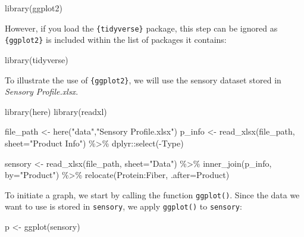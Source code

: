 \documentclass[
]{book}
\newenvironment{Shaded}{\begin{snugshade}}{\end{snugshade}}
\newcommand{\AttributeTok}[1]{\textcolor[rgb]{0.77,0.63,0.00}{#1}}
\newcommand{\FunctionTok}[1]{\textcolor[rgb]{0.00,0.00,0.00}{#1}}
\newcommand{\NormalTok}[1]{#1}
\newcommand{\OtherTok}[1]{\textcolor[rgb]{0.56,0.35,0.01}{#1}}
\newcommand{\SpecialCharTok}[1]{\textcolor[rgb]{0.00,0.00,0.00}{#1}}
\newcommand{\StringTok}[1]{\textcolor[rgb]{0.31,0.60,0.02}{#1}}
\begin{document}
\begin{Shaded}
\begin{Highlighting}[]
\FunctionTok{library}\NormalTok{(ggplot2)}
\end{Highlighting}
\end{Shaded}

However, if you load the \texttt{\{tidyverse\}} package, this step can be ignored as \texttt{\{ggplot2\}} is included within the list of packages it contains:

\begin{Shaded}
\begin{Highlighting}[]
\FunctionTok{library}\NormalTok{(tidyverse)}
\end{Highlighting}
\end{Shaded}

To illustrate the use of \texttt{\{ggplot2\}}, we will use the sensory dataset stored in \emph{Sensory Profile.xlsx}.

\begin{Shaded}
\begin{Highlighting}[]
\FunctionTok{library}\NormalTok{(here)}
\FunctionTok{library}\NormalTok{(readxl)}

\NormalTok{file\_path }\OtherTok{\textless{}{-}} \FunctionTok{here}\NormalTok{(}\StringTok{"data"}\NormalTok{,}\StringTok{"Sensory Profile.xlsx"}\NormalTok{) }
\NormalTok{p\_info }\OtherTok{\textless{}{-}} \FunctionTok{read\_xlsx}\NormalTok{(file\_path, }\AttributeTok{sheet=}\StringTok{"Product Info"}\NormalTok{) }\SpecialCharTok{\%\textgreater{}\%} 
\NormalTok{  dplyr}\SpecialCharTok{::}\FunctionTok{select}\NormalTok{(}\SpecialCharTok{{-}}\NormalTok{Type)}

\NormalTok{sensory }\OtherTok{\textless{}{-}} \FunctionTok{read\_xlsx}\NormalTok{(file\_path, }\AttributeTok{sheet=}\StringTok{"Data"}\NormalTok{) }\SpecialCharTok{\%\textgreater{}\%} 
  \FunctionTok{inner\_join}\NormalTok{(p\_info, }\AttributeTok{by=}\StringTok{"Product"}\NormalTok{) }\SpecialCharTok{\%\textgreater{}\%} 
  \FunctionTok{relocate}\NormalTok{(Protein}\SpecialCharTok{:}\NormalTok{Fiber, }\AttributeTok{.after=}\NormalTok{Product)}
\end{Highlighting}
\end{Shaded}

To initiate a graph, we start by calling the function \texttt{ggplot()}.
Since the data we want to use is stored in \texttt{sensory}, we apply \texttt{ggplot()} to \texttt{sensory}:

\begin{Shaded}
\begin{Highlighting}[]
\NormalTok{p }\OtherTok{\textless{}{-}} \FunctionTok{ggplot}\NormalTok{(sensory)}
\end{Highlighting}
\end{Shaded}
\end{document}
